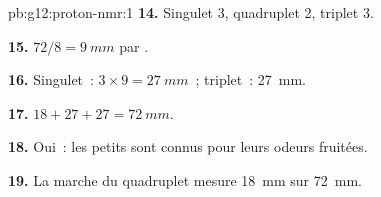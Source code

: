 \begin{solution}{pb:g12:proton-nmr:1}
\textbf{14.} Singulet 3, quadruplet 2, triplet 3.

\textbf{15.} $72 / 8 = \qty{9}{mm}$ par .

\textbf{16.} Singulet~: $3 \times 9 = \qty{27}{mm}$~; triplet~:
\qty{27}{mm}.

\textbf{17.} $18 + 27 + 27 = \qty{72}{mm}$.

\textbf{18.} Oui~: les petits  sont connus pour leurs odeurs
fruitées.

\textbf{19.} La marche du quadruplet mesure \qty{18}{mm} sur
\qty{72}{mm}.
\end{solution}
